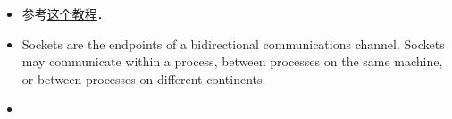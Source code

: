 
\begin{itemize}
\item 参考\href{https://www.tutorialspoint.com/python/python_networking.htm}{这个教程}．
\item Sockets are the endpoints of a bidirectional communications channel. Sockets may communicate within a process, between processes on the same machine, or between processes on different continents.
\item 
\end{itemize}
